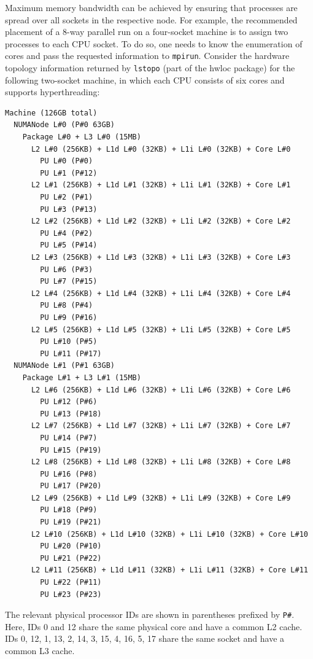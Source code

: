 {{Maximum memory bandwidth can be achieved by ensuring that processes are spread over all sockets in the respective node.
For example, the recommended placement of a 8-way parallel run on a four-socket machine is to assign two processes to each CPU socket.
To do so, one needs to know the enumeration of cores and pass the requested information to \lstinline|mpirun|.
Consider the hardware topology information returned by \lstinline|lstopo| (part of the hwloc package) for the following two-socket machine, in which each CPU consists of six cores and supports hyperthreading:
\begin{lstlisting}
Machine (126GB total)
  NUMANode L#0 (P#0 63GB)
    Package L#0 + L3 L#0 (15MB)
      L2 L#0 (256KB) + L1d L#0 (32KB) + L1i L#0 (32KB) + Core L#0
        PU L#0 (P#0)
        PU L#1 (P#12)
      L2 L#1 (256KB) + L1d L#1 (32KB) + L1i L#1 (32KB) + Core L#1
        PU L#2 (P#1)
        PU L#3 (P#13)
      L2 L#2 (256KB) + L1d L#2 (32KB) + L1i L#2 (32KB) + Core L#2
        PU L#4 (P#2)
        PU L#5 (P#14)
      L2 L#3 (256KB) + L1d L#3 (32KB) + L1i L#3 (32KB) + Core L#3
        PU L#6 (P#3)
        PU L#7 (P#15)
      L2 L#4 (256KB) + L1d L#4 (32KB) + L1i L#4 (32KB) + Core L#4
        PU L#8 (P#4)
        PU L#9 (P#16)
      L2 L#5 (256KB) + L1d L#5 (32KB) + L1i L#5 (32KB) + Core L#5
        PU L#10 (P#5)
        PU L#11 (P#17)
  NUMANode L#1 (P#1 63GB)
    Package L#1 + L3 L#1 (15MB)
      L2 L#6 (256KB) + L1d L#6 (32KB) + L1i L#6 (32KB) + Core L#6
        PU L#12 (P#6)
        PU L#13 (P#18)
      L2 L#7 (256KB) + L1d L#7 (32KB) + L1i L#7 (32KB) + Core L#7
        PU L#14 (P#7)
        PU L#15 (P#19)
      L2 L#8 (256KB) + L1d L#8 (32KB) + L1i L#8 (32KB) + Core L#8
        PU L#16 (P#8)
        PU L#17 (P#20)
      L2 L#9 (256KB) + L1d L#9 (32KB) + L1i L#9 (32KB) + Core L#9
        PU L#18 (P#9)
        PU L#19 (P#21)
      L2 L#10 (256KB) + L1d L#10 (32KB) + L1i L#10 (32KB) + Core L#10
        PU L#20 (P#10)
        PU L#21 (P#22)
      L2 L#11 (256KB) + L1d L#11 (32KB) + L1i L#11 (32KB) + Core L#11
        PU L#22 (P#11)
        PU L#23 (P#23)
\end{lstlisting}
The relevant physical processor IDs are shown in parentheses prefixed by \lstinline|P#|.
Here, IDs 0 and 12 share the same physical core and have a common L2 cache.
IDs 0, 12, 1, 13, 2, 14, 3, 15, 4, 16, 5, 17 share the same socket and have a common L3 cache.

}}
